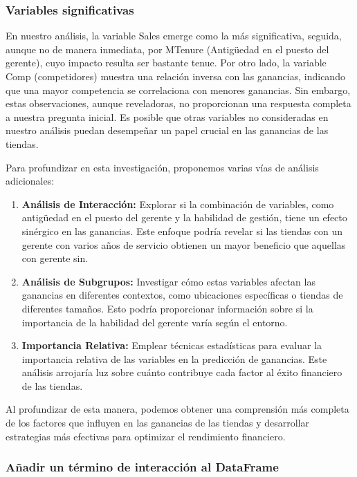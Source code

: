\documentclass[
]{article}
\begin{document}
\hypertarget{variables-significativas}{%
\subsubsection{Variables
significativas}\label{variables-significativas}}

En nuestro análisis, la variable Sales emerge como la más significativa,
seguida, aunque no de manera inmediata, por MTenure (Antigüedad en el
puesto del gerente), cuyo impacto resulta ser bastante tenue. Por otro
lado, la variable Comp (competidores) muestra una relación inversa con
las ganancias, indicando que una mayor competencia se correlaciona con
menores ganancias. Sin embargo, estas observaciones, aunque reveladoras,
no proporcionan una respuesta completa a nuestra pregunta inicial. Es
posible que otras variables no consideradas en nuestro análisis puedan
desempeñar un papel crucial en las ganancias de las tiendas.

Para profundizar en esta investigación, proponemos varias vías de
análisis adicionales:

\begin{enumerate}
\def\labelenumi{\arabic{enumi}.}
\item
  \textbf{Análisis de Interacción:} Explorar si la combinación de
  variables, como antigüedad en el puesto del gerente y la habilidad de
  gestión, tiene un efecto sinérgico en las ganancias. Este enfoque
  podría revelar si las tiendas con un gerente con varios años de
  servicio obtienen un mayor beneficio que aquellas con gerente sin.
\item
  \textbf{Análisis de Subgrupos:} Investigar cómo estas variables
  afectan las ganancias en diferentes contextos, como ubicaciones
  específicas o tiendas de diferentes tamaños. Esto podría proporcionar
  información sobre si la importancia de la habilidad del gerente varía
  según el entorno.
\item
  \textbf{Importancia Relativa:} Emplear técnicas estadísticas para
  evaluar la importancia relativa de las variables en la predicción de
  ganancias. Este análisis arrojaría luz sobre cuánto contribuye cada
  factor al éxito financiero de las tiendas.
\end{enumerate}

Al profundizar de esta manera, podemos obtener una comprensión más
completa de los factores que influyen en las ganancias de las tiendas y
desarrollar estrategias más efectivas para optimizar el rendimiento
financiero.

\hypertarget{auxf1adir-un-tuxe9rmino-de-interacciuxf3n-al-dataframe}{%
\subsubsection{Añadir un término de interacción al
DataFrame}\label{auxf1adir-un-tuxe9rmino-de-interacciuxf3n-al-dataframe}}
\end{document}
